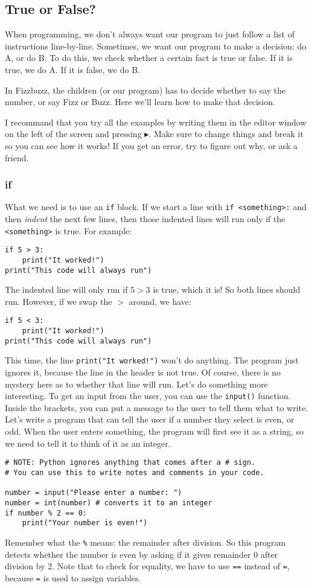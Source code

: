 \documentclass[a4paper]{article}
\begin{document}
\subsection{True or False?}

When programming, we don't always want our program to just follow a list of instructions line-by-line. Sometimes, we want our program to make a decision: do A, or do B. To do this, we check whether a certain fact is true or false. If it is true, we do A. If it is false, we do B.

In Fizzbuzz, the children (or our program) has to decide whether to say the number, or say Fizz or Buzz. Here we'll learn how to make that decision.

I recommand that you try all the examples by writing them in the editor window on the left of the screen and pressing $\blacktriangleright$. Make sure to change things and break it so you can see how it works! If you get an error, try to figure out why, or ask a friend.

\subsubsection{if}

What we need is to use an \verb|if| block. If we start a line with \verb|if <something>:| and then \emph{indent} the next few lines, then those indented lines will run only if the \verb|<something>| is true. For example:
\begin{lstlisting}
if 5 > 3:
    print("It worked!")
print("This code will always run")
\end{lstlisting}
The indented line will only run if $5 > 3$ is true, which it is! So both lines should run. However, if we swap the $>$ around, we have:
\begin{lstlisting}
if 5 < 3:
    print("It worked!")
print("This code will always run")
\end{lstlisting}
\noindent This time, the line \verb|print("It worked!")| won't do anything. The program just ignores it, because the line in the header is not true. Of course, there is no mystery here as to whether that line will run. Let's do something more interesting. To get an input from the user, you can use the \verb|input()| function. Inside the brackets, you can put a message to the user to tell them what to write. Let's write a program that can tell the user if a number they select is even, or odd. When the user enters something, the program will first see it as a string, so we need to tell it to think of it as an integer.
\begin{lstlisting}
# NOTE: Python ignores anything that comes after a # sign.
# You can use this to write notes and comments in your code.

number = input("Please enter a number: ")
number = int(number) # converts it to an integer
if number % 2 == 0:
    print("Your number is even!")
\end{lstlisting}
\noindent Remember what the \verb|%| means: the remainder after division. So this program detects whether the number is even by asking if it gives remainder 0 after division by 2. Note that to check for equality, we have to use \verb|==| instead of \verb|=|, because \verb|=| is used to assign variables.
\end{document}
